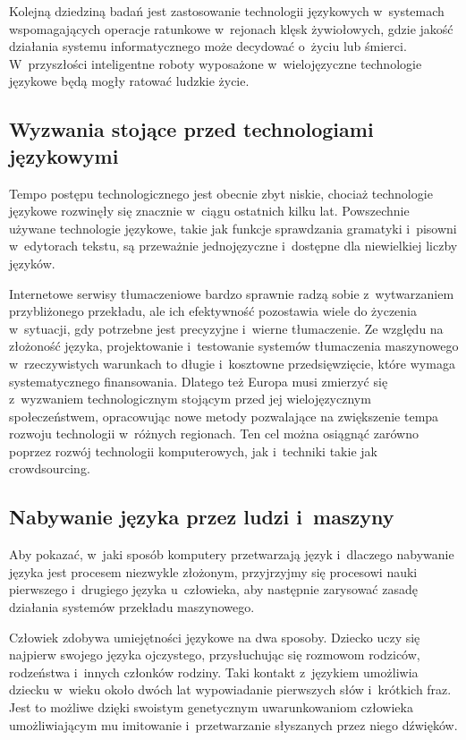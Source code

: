 \begin{multicols}{2}
Kolejną dziedziną badań jest zastosowanie technologii językowych
w~systemach wspomagających operacje ratunkowe w~rejonach klęsk
żywiołowych, gdzie jakość działania systemu informatycznego może
decydować o~życiu lub śmierci. W~przyszłości inteligentne roboty
wyposażone w~wielojęzyczne technologie językowe będą mogły
ratować ludzkie życie. 

\subsection{Wyzwania stojące przed technologiami językowymi} 

Tempo postępu technologicznego jest obecnie zbyt niskie, chociaż
technologie językowe rozwinęły się znacznie w~ciągu ostatnich
kilku lat. Powszechnie używane technologie językowe, takie jak
funkcje sprawdzania gramatyki i~pisowni w~edytorach tekstu, są
przeważnie jednojęzyczne i~dostępne dla niewielkiej liczby
języków. 


Internetowe serwisy tłumaczeniowe bardzo sprawnie radzą sobie
z~wytwarzaniem przybliżonego przekładu, ale ich efektywność
pozostawia wiele do życzenia w~sytuacji, gdy potrzebne jest
precyzyjne i~wierne tłumaczenie. Ze względu na złożoność
języka, projektowanie i~testowanie systemów tłumaczenia maszynowego
w~rzeczywistych warunkach to długie i~kosztowne przedsięwzięcie,
które wymaga systematycznego finansowania. Dlatego też Europa musi
zmierzyć się z~wyzwaniem technologicznym stojącym przed jej
wielojęzycznym społeczeństwem, opracowując nowe metody
pozwalające na zwiększenie tempa rozwoju technologii w~różnych
regionach. Ten cel można osiągnąć zarówno poprzez rozwój
technologii komputerowych, jak i~techniki takie jak crowdsourcing. 

\subsection{Nabywanie języka przez ludzi i~maszyny} Aby pokazać,
w~jaki sposób komputery przetwarzają język i~dlaczego nabywanie
języka jest procesem niezwykle złożonym, przyjrzyjmy się procesowi
nauki pierwszego i~drugiego języka u~człowieka, aby następnie
zarysować zasadę działania systemów przekładu maszynowego. 

Człowiek zdobywa umiejętności językowe na dwa sposoby. Dziecko
uczy się najpierw swojego języka ojczystego, przysłuchując się
rozmowom rodziców, rodzeństwa i~innych członków rodziny. Taki
kontakt z~językiem umożliwia dziecku w~wieku około dwóch lat
wypowiadanie pierwszych słów i~krótkich fraz. Jest to możliwe
dzięki swoistym genetycznym uwarunkowaniom człowieka
umożliwiającym mu imitowanie i~przetwarzanie słyszanych przez niego
dźwięków. 


\end{multicols}
